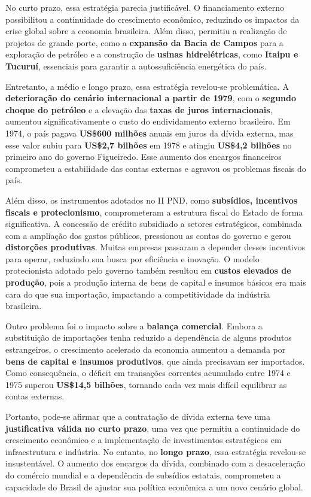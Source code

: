 \documentclass[a4paper,12pt]{article}[abntex2]
\begin{document}
No curto prazo, essa estratégia parecia justificável. O financiamento externo possibilitou a continuidade do crescimento econômico, reduzindo os impactos da crise global sobre a economia brasileira. Além disso, permitiu a realização de projetos de grande porte, como a \textbf{expansão da Bacia de Campos} para a exploração de petróleo e a construção de \textbf{usinas hidrelétricas}, como \textbf{Itaipu e Tucuruí}, essenciais para garantir a autossuficiência energética do país.

Entretanto, a médio e longo prazo, essa estratégia revelou-se problemática. A \textbf{deterioração do cenário internacional a partir de 1979}, com o \textbf{segundo choque do petróleo} e a elevação das \textbf{taxas de juros internacionais}, aumentou significativamente o custo do endividamento externo brasileiro. Em 1974, o país pagava \textbf{US\$600 milhões} anuais em juros da dívida externa, mas esse valor subiu para \textbf{US\$2,7 bilhões} em 1978 e atingiu \textbf{US\$4,2 bilhões} no primeiro ano do governo Figueiredo. Esse aumento dos encargos financeiros comprometeu a estabilidade das contas externas e agravou os problemas fiscais do país.

Além disso, os instrumentos adotados no II PND, como \textbf{subsídios, incentivos fiscais e protecionismo}, comprometeram a estrutura fiscal do Estado de forma significativa. A concessão de crédito subsidiado a setores estratégicos, combinada com a ampliação dos gastos públicos, pressionou as contas do governo e gerou \textbf{distorções produtivas}. Muitas empresas passaram a depender desses incentivos para operar, reduzindo sua busca por eficiência e inovação. O modelo protecionista adotado pelo governo também resultou em \textbf{custos elevados de produção}, pois a produção interna de bens de capital e insumos básicos era mais cara do que sua importação, impactando a competitividade da indústria brasileira.

Outro problema foi o impacto sobre a \textbf{balança comercial}. Embora a substituição de importações tenha reduzido a dependência de alguns produtos estrangeiros, o crescimento acelerado da economia aumentou a demanda por \textbf{bens de capital e insumos produtivos}, que ainda precisavam ser importados. Como consequência, o déficit em transações correntes acumulado entre 1974 e 1975 superou \textbf{US\$14,5 bilhões}, tornando cada vez mais difícil equilibrar as contas externas.

Portanto, pode-se afirmar que a contratação de dívida externa teve uma \textbf{justificativa válida no curto prazo}, uma vez que permitiu a continuidade do crescimento econômico e a implementação de investimentos estratégicos em infraestrutura e indústria. No entanto, no \textbf{longo prazo}, essa estratégia revelou-se insustentável. O aumento dos encargos da dívida, combinado com a desaceleração do comércio mundial e a dependência de subsídios estatais, comprometeu a capacidade do Brasil de ajustar sua política econômica a um novo cenário global.
\end{document}
